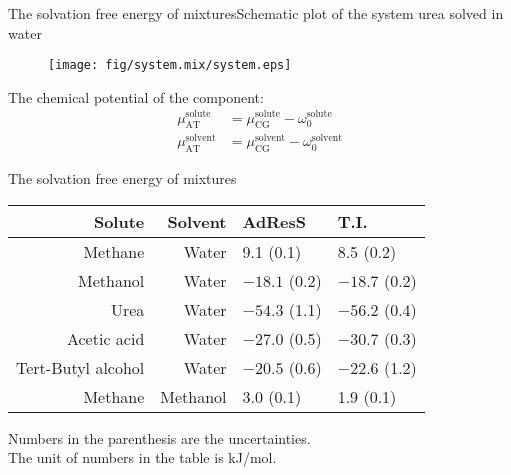 \documentclass[]{beamer}
\newcommand{\bluec}[1]{{\color{blue} #1}}
\newcommand{\AT}{{\textrm{{AT}}}}
\newcommand{\CG}{{\textrm{CG}}}
\begin{document}
\begin{frame}{The solvation free energy of mixtures}{Schematic plot of the system urea solved in water}
  \begin{figure}
    \centering
    \texttt{[image: fig/system.mix/system.eps]}
  \end{figure}
  The chemical potential of the component:
  \bluec{
    \begin{align*}
      \mu^{\textrm{solute}}_\AT &= \mu^{\textrm{solute}}_\CG - \omega^{\textrm{solute}}_0\\
      \mu^{\textrm{solvent}}_\AT &= \mu^{\textrm{solvent}}_\CG - \omega^{\textrm{solvent}}_0
    \end{align*}
  }
\end{frame}


\begin{frame}{The solvation free energy of mixtures}
  \begin{table}
    \centering
    \begin{tabular}{rr  R{3cm} R{3cm}}
      Solute & Solvent & AdResS &
      T.I.\\
      \hline
      Methane & Water  & 9.1 (0.1) & 8.5 (0.2)  \\
      Methanol & Water  & $-18.1$ (0.2) & $-18.7$ (0.2)  \\
      Urea &Water  & $-54.3$ (1.1) & $-56.2$ (0.4) \\
      Acetic acid &Water  & $-27.0$ (0.5) & $-30.7$ (0.3) \\
      Tert-Butyl alcohol &Water  & $-20.5$ (0.6) & $-22.6$ (1.2) \\
      Methane & Methanol & 3.0 (0.1) & 1.9 (0.1)  \\
    \end{tabular}
  \end{table}
  \vfill
  \footnotesize{Numbers in the parenthesis are the uncertainties. \\The unit of numbers in the table is kJ/mol.}
\end{frame}
\end{document}
